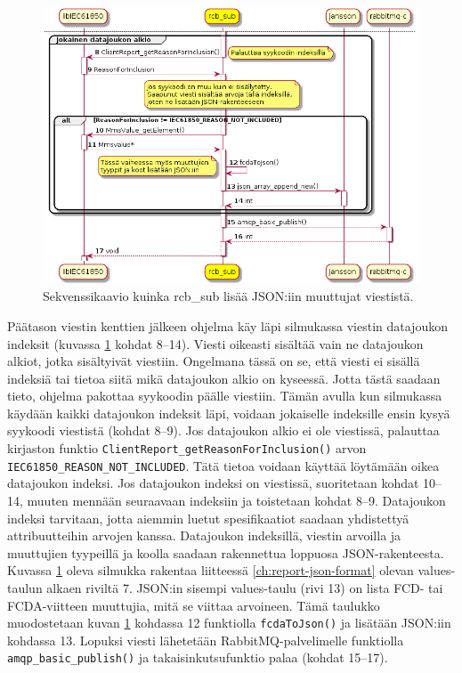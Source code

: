 \begin{figure}[ht!]
	\includegraphics[width=1\textwidth]{pictures/rcb-sub-report-to-json_001.png}
	\caption{Sekvenssikaavio kuinka rcb\_sub lisää JSON:iin muuttujat viestistä.}
	\label{fig:rcb-sub-report-to-json-2}
\end{figure}

Päätason viestin kenttien jälkeen ohjelma käy läpi silmukassa viestin datajoukon indeksit (kuvassa \ref{fig:rcb-sub-report-to-json-2} kohdat 8--14). Viesti oikeasti sisältää vain ne datajoukon alkiot, jotka sisältyivät viestiin. Ongelmana tässä on se, että viesti ei sisällä indeksiä tai tietoa siitä mikä datajoukon alkio on kyseessä. Jotta tästä saadaan tieto, ohjelma pakottaa syykoodin päälle viestiin. Tämän avulla kun silmukassa käydään kaikki datajoukon indeksit läpi, voidaan jokaiselle indeksille ensin kysyä syykoodi viestistä (kohdat 8--9). Jos datajoukon alkio ei ole viestissä, palauttaa kirjaston funktio \texttt{Cli\-entRe\-port\-\_\-get\-Rea\-son\-For\-Inc\-lu\-si\-on\-()} arvon \texttt{IEC61850\_REASON\_NOT\_INCLUDED}. Tätä tietoa voidaan käyttää löytämään oikea datajoukon indeksi. Jos datajoukon indeksi on viestissä, suoritetaan kohdat 10--14, muuten mennään seuraavaan indeksiin ja toistetaan kohdat 8--9. Datajoukon indeksi tarvitaan, jotta aiemmin luetut spesifikaatiot saadaan yhdistettyä attribuutteihin arvojen kanssa. Datajoukon indeksillä, viestin arvoilla ja muuttujien tyypeillä ja koolla saadaan rakennettua loppuosa JSON-rakenteesta. Kuvassa \ref{fig:rcb-sub-report-to-json-2} oleva silmukka rakentaa liitteessä \ref{ch:report-json-format} olevan values-taulun alkaen riviltä 7. JSON:in sisempi values-taulu (rivi 13) on lista FCD- tai FCDA-viitteen muuttujia, mitä se viittaa arvoineen. Tämä taulukko muodostetaan kuvan \ref{fig:rcb-sub-report-to-json-2} kohdassa 12 funktiolla \texttt{fcdaToJson()} ja lisätään JSON:iin kohdassa 13. Lopuksi viesti lähetetään RabbitMQ-palvelimelle funktiolla \texttt{amqp\_basic\_publish()} ja takaisinkutsufunktio palaa (kohdat 15--17).

